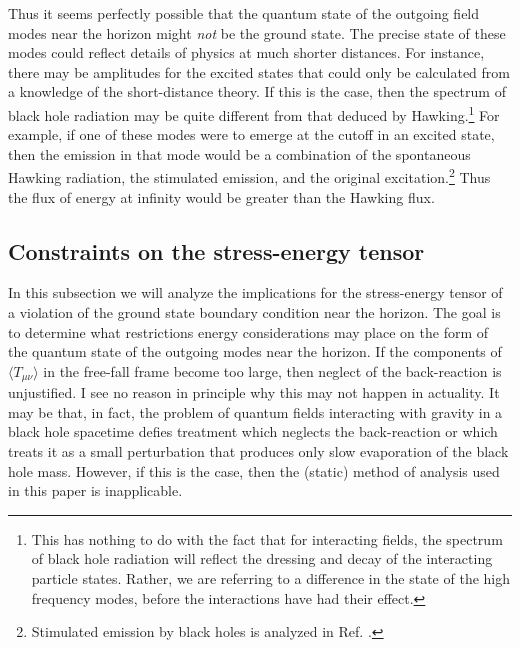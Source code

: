 \documentclass[12pt]{article}
\def\la{\langle}
\def\ra{\rangle}
\begin{document}
Thus it seems perfectly possible that the quantum state of the outgoing
field modes near the horizon might {\it not} be the ground state.
The precise state of these modes could reflect details of physics
at much shorter distances. For instance, there may be amplitudes
for the excited states that could only be calculated from a
knowledge of the short-distance theory. If this is the case, then
the spectrum of black hole radiation may be quite different from
that deduced by Hawking.\footnote{This has nothing to do with the
fact that for interacting fields, the spectrum of black hole
radiation will reflect the dressing and decay of the interacting
particle states. Rather, we are referring to a
difference in the state of the high frequency modes, before the
interactions have had their effect.}
For example, if one of these modes
were to emerge at the cutoff in an excited state, then the
emission in that mode would be a combination of the spontaneous
Hawking radiation, the stimulated emission, and the original
excitation.\footnote{Stimulated emission by black
holes is analyzed in Ref. \cite{Waldstim}.}
Thus the flux of energy at infinity would be greater than
the Hawking flux.

\subsection{Constraints on the stress-energy tensor}
\label{subsec:constraints}

In this subsection we will analyze the implications for the
stress-energy tensor of a violation of the ground state
boundary condition near the horizon. The goal is to
determine what restrictions energy considerations may
place on the form of the quantum state of the outgoing
modes near the horizon. If the components of $\la T_{\mu\nu}\ra$
in the free-fall frame become too large, then neglect
of the back-reaction is unjustified. I see no reason in
principle why this may not happen in actuality. It may
be that, in fact, the problem of quantum fields
interacting with gravity in a black hole spacetime
defies treatment which neglects the back-reaction or
which treats it as a small perturbation that produces
only slow evaporation of the black hole mass. However,
if this is the case, then the (static) method of analysis used
in this paper is inapplicable.
\end{document}
